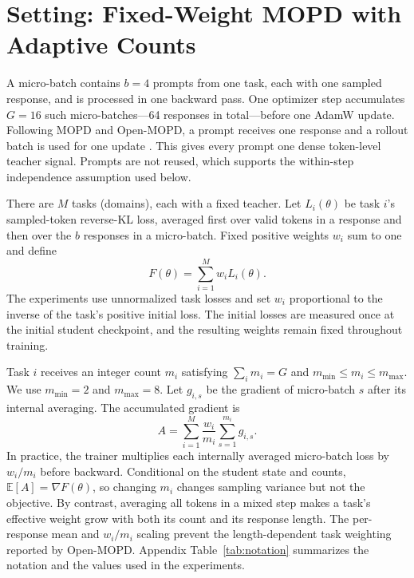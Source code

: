 \section{Setting: Fixed-Weight MOPD with Adaptive Counts}
\label{sec:setting}

A micro-batch contains $b=4$ prompts from one task, each with one sampled
response, and is processed in one backward pass. One optimizer step accumulates
$G=16$ such micro-batches---64 responses in total---before one AdamW update.
Following MOPD and Open-MOPD, a prompt receives one response and a rollout batch
is used for one update \citep{ma2026mopdmultiteacheronpolicydistillation,
gao2026openmopddiagnosingfixingcapability}. This gives every prompt one dense
token-level teacher signal. Prompts are not reused, which supports the
within-step independence assumption used below.

There are $M$ tasks (domains), each with a fixed teacher. Let $L_i(\theta)$ be
task $i$'s sampled-token reverse-KL loss, averaged first over valid tokens in a
response and then over the $b$ responses in a micro-batch. Fixed positive
weights $w_i$ sum to one and define
\begin{equation}
    F(\theta)=\sum_{i=1}^M w_i L_i(\theta).
    \label{eq:fixed_multitask_objective}
\end{equation}
The experiments use unnormalized task losses and set $w_i$ proportional to the
inverse of the task's positive initial loss. The initial losses are measured
once at the initial student checkpoint, and the resulting weights remain fixed
throughout training.

Task $i$ receives an integer count $m_i$ satisfying
$\sum_i m_i=G$ and $m_{\min}\leq m_i\leq m_{\max}$. We use
$m_{\min}=2$ and $m_{\max}=8$. Let $g_{i,s}$ be the gradient of micro-batch
$s$ after its internal averaging. The accumulated gradient is
\begin{equation}
    A=\sum_{i=1}^M\frac{w_i}{m_i}
      \sum_{s=1}^{m_i}g_{i,s}.
    \label{eq:batch_gradient_observation}
\end{equation}
In practice, the trainer multiplies each internally averaged micro-batch loss
by $w_i/m_i$ before backward. Conditional on the student state and counts,
$\mathbb E[A]=\nabla F(\theta)$, so changing $m_i$ changes sampling variance
but not the objective. By contrast, averaging all tokens in a mixed step makes
a task's effective weight grow with both its count and its response length.
The per-response mean and $w_i/m_i$ scaling prevent the length-dependent task
weighting reported by Open-MOPD. Appendix Table~\ref{tab:notation} summarizes
the notation and the values used in the experiments.
